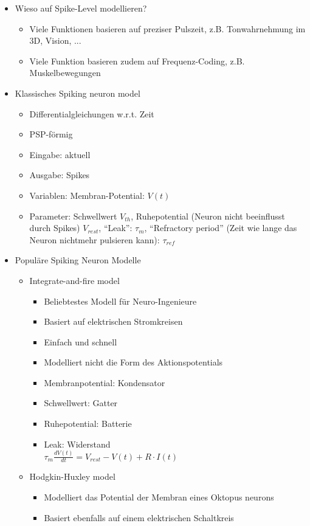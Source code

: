 \documentclass[paper=a4, fontsize=11pt]{scrartcl} %
\numberwithin{equation}{section} %
\numberwithin{figure}{section} %
\numberwithin{table}{section} %
\begin{document}
\begin{itemize}
\item Wieso auf Spike-Level modellieren?
\begin{itemize}
\item Viele Funktionen basieren auf preziser Pulszeit, z.B. Tonwahrnehmung im 3D, Vision, ...
\item Viele Funktion basieren zudem auf Frequenz-Coding, z.B. Muskelbewegungen
\end{itemize}
\item Klassisches Spiking neuron model
\begin{itemize}
\item Differentialgleichungen w.r.t. Zeit
\item PSP-förmig
\item Eingabe: aktuell
\item Ausgabe: Spikes
\item Variablen: Membran-Potential: $V(t)$
\item Parameter: Schwellwert $V_{th}$, Ruhepotential (Neuron nicht beeinflusst durch Spikes) $V_{rest}$, ``Leak'': $\tau_m$, ``Refractory period'' (Zeit wie lange das Neuron nichtmehr pulsieren kann): $\tau_{ref}$
\end{itemize}
\item Populäre Spiking Neuron Modelle
\begin{itemize}
\item Integrate-and-fire model
\begin{itemize}
\item Beliebtestes Modell für Neuro-Ingenieure
\item Basiert auf elektrischen Stromkreisen
\item Einfach und schnell
\item Modelliert nicht die Form des Aktionspotentials
\item Membranpotential: Kondensator
\item Schwellwert: Gatter
\item Ruhepotential: Batterie
\item Leak: Widerstand\\ $\tau_m \frac{dV(t)}{dt} = V_{rest} - V(t) + R \cdot I(t)$
\end{itemize}
\item Hodgkin-Huxley model
\begin{itemize}
\item Modelliert das Potential der Membran eines Oktopus neurons
\item Basiert ebenfalls auf einem elektrischen Schaltkreis

\end{itemize}
\end{itemize}
\end{itemize}
\end{document}
